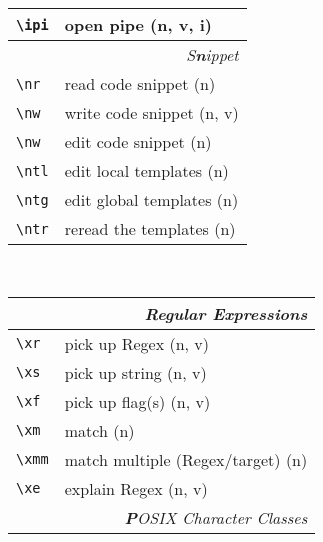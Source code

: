 \documentclass[oneside,10pt,landscape,DIV17]{scrartcl}
\begin{document}
\begin{multicols}{3}
\begin{center}
\begin{tabular}[]{|p{11mm}|p{58mm}|}
\hline \verb'\ipi' & open pipe                 \hfill (n, v, i)\\
\hline
\hline
\multicolumn{2}{|r|}{\textsl{S\textbf{n}ippet}}             \\
\hline \verb'\nr'  & read code snippet         \hfill (n)   \\
\hline \verb'\nw'  & write code snippet        \hfill (n, v)\\
\hline \verb'\nw'  & edit code snippet         \hfill (n)   \\
%
\hline \verb'\ntl' & edit local templates      \hfill (n)   \\
\hline \verb'\ntg' & edit global templates     \hfill (n)   \\
\hline \verb'\ntr' & reread the templates      \hfill (n)   \\
\hline
\end{tabular}\\
%
%
\begin{tabular}[]{|p{11mm}|p{58mm}|}
\hline
\multicolumn{2}{|r|}{\textsl{Regular E\textbf{x}pressions}} \\
\hline \verb'\xr' &  pick up Regex                 \hfill (n, v)\\
\hline \verb'\xs' &  pick up string                \hfill (n, v)\\
\hline \verb'\xf' &  pick up flag(s)               \hfill (n, v)\\
\hline \verb'\xm' &  match                         \hfill (n)   \\
\hline \verb'\xmm'&  match multiple (Regex/target) \hfill (n)   \\
\hline \verb'\xe' &  explain Regex                 \hfill (n, v)\\
\hline
\hline
\multicolumn{2}{|r|}{\textsl{\textbf{P}OSIX Character Classes}}\\

\end{tabular}
\end{center}
\end{multicols}
\end{document}
